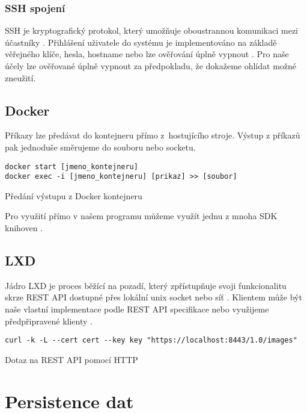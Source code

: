\subsubsection{SSH spojení}

SSH je kryptografický protokol, který umožňuje oboustrannou komunikaci mezi účastníky \cite{ssh_rfc}.
Přihlášení uživatele do systému je implementováno na základě věřejného klíče, hesla, hostname nebo lze ověřování úplně vypnout \cite{ssh_auth_rfc}.
Pro naše účely lze ověřované úplně vypnout za předpokladu, že dokažeme ohlídat možné zneužití.

\subsection{Docker}

Příkazy lze předávat do kontejneru přímo z~hostujícího stroje.
Výstup z příkazů pak jednoduše směrujeme do souboru nebo socketu.

\begin{listing}[ht]
\begin{verbatim}
docker start [jmeno_kontejneru]
docker exec -i [jmeno_kontejneru] [prikaz] >> [soubor]
\end{verbatim}
\caption{Předání výstupu z Docker kontejneru}
\end{listing}

Pro využití přímo v našem programu můžeme využít jednu z mnoha SDK knihoven \cite{docker_sdk}.

\subsection{LXD}

Jádro LXD je proces běžící na pozadí, který zpřístupňuje svoji funkcionalitu skrze REST API dostupné přes lokální unix socket nebo síť \cite{lxd}.
Klientem může být naše vlastní implementace podle REST API specifikace nebo využijeme předpřipravené klienty \cite{lxd_rest}.

\begin{listing}[ht]
\begin{verbatim}
curl -k -L --cert cert --key key "https://localhost:8443/1.0/images"
\end{verbatim}
\caption{Dotaz na REST API pomocí HTTP}
\end{listing}

\section{Persistence dat}


